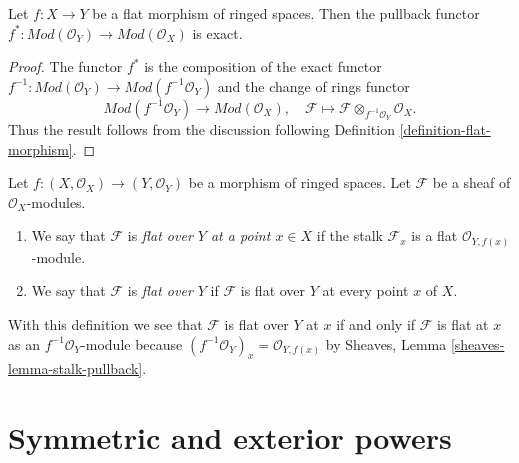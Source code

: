 \begin{lemma}
\label{lemma-pullback-flat}
Let $f : X \to Y$ be a flat morphism of ringed spaces.
Then the pullback functor
$f^* : \textit{Mod}(\mathcal{O}_Y) \to \textit{Mod}(\mathcal{O}_X)$
is exact.
\end{lemma}

\begin{proof}
The functor $f^*$ is the composition of the exact functor
$f^{-1} : \textit{Mod}(\mathcal{O}_Y) \to \textit{Mod}(f^{-1}\mathcal{O}_Y)$
and the change of rings functor
$$
\textit{Mod}(f^{-1}\mathcal{O}_Y) \to \textit{Mod}(\mathcal{O}_X), \quad
\mathcal{F} \longmapsto
\mathcal{F} \otimes_{f^{-1}\mathcal{O}_Y} \mathcal{O}_X.
$$
Thus the result follows from the discussion following
Definition \ref{definition-flat-morphism}.
\end{proof}

\begin{definition}
\label{definition-flat-module}
Let $f : (X, \mathcal{O}_X) \to (Y, \mathcal{O}_Y)$ be a morphism of
ringed spaces. Let $\mathcal{F}$ be a sheaf of $\mathcal{O}_X$-modules.
\begin{enumerate}
\item We say that $\mathcal{F}$ is {\it flat over $Y$ at a point $x \in X$}
if the stalk $\mathcal{F}_x$ is a flat $\mathcal{O}_{Y, f(x)}$-module.
\item We say that $\mathcal{F}$ is {\it flat over $Y$} if
$\mathcal{F}$ is flat over $Y$ at every point $x$ of $X$.
\end{enumerate}
\end{definition}

\noindent
With this definition we see that $\mathcal{F}$ is flat over $Y$ at $x$
if and only if $\mathcal{F}$ is flat at $x$ as an
$f^{-1}\mathcal{O}_Y$-module because
$(f^{-1}\mathcal{O}_Y)_x = \mathcal{O}_{Y, f(x)}$ by
Sheaves, Lemma \ref{sheaves-lemma-stalk-pullback}.















\section{Symmetric and exterior powers}
\label{section-symmetric-exterior}

